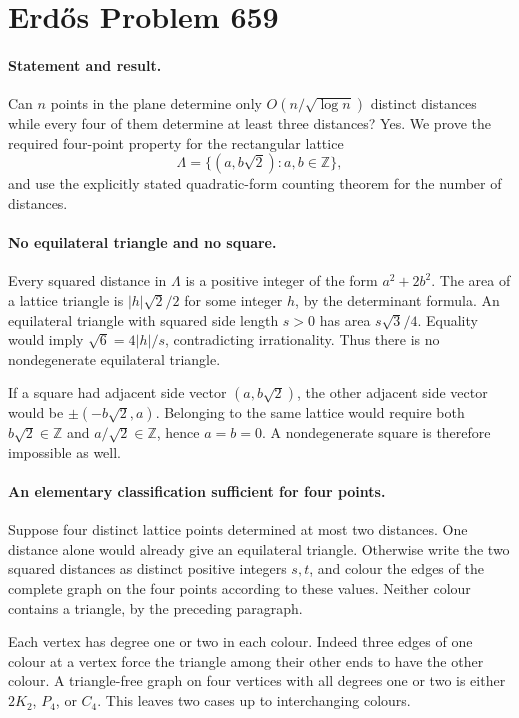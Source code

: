 \section*{Erd\H{o}s Problem 659}

\paragraph{Statement and result.}
Can \(n\) points in the plane determine only \(O(n/\sqrt{\log n})\) distinct distances while every four of them determine at least three distances? Yes. We prove the required four-point property for the rectangular lattice
\[
 \Lambda=\{(a,b\sqrt2):a,b\in\mathbb Z\},
\]
and use the explicitly stated quadratic-form counting theorem for the number of distances.

\paragraph{No equilateral triangle and no square.}
Every squared distance in \(\Lambda\) is a positive integer of the form \(a^2+2b^2\). The area of a lattice triangle is \(|h|\sqrt2/2\) for some integer \(h\), by the determinant formula. An equilateral triangle with squared side length \(s>0\) has area \(s\sqrt3/4\). Equality would imply \(\sqrt6=4|h|/s\), contradicting irrationality. Thus there is no nondegenerate equilateral triangle.

If a square had adjacent side vector \((a,b\sqrt2)\), the other adjacent side vector would be \(\pm(-b\sqrt2,a)\). Belonging to the same lattice would require both \(b\sqrt2\in\mathbb Z\) and \(a/\sqrt2\in\mathbb Z\), hence \(a=b=0\). A nondegenerate square is therefore impossible as well.

\paragraph{An elementary classification sufficient for four points.}
Suppose four distinct lattice points determined at most two distances. One distance alone would already give an equilateral triangle. Otherwise write the two squared distances as distinct positive integers \(s,t\), and colour the edges of the complete graph on the four points according to these values. Neither colour contains a triangle, by the preceding paragraph.

Each vertex has degree one or two in each colour. Indeed three edges of one colour at a vertex force the triangle among their other ends to have the other colour. A triangle-free graph on four vertices with all degrees one or two is either \(2K_2\), \(P_4\), or \(C_4\). This leaves two cases up to interchanging colours.

